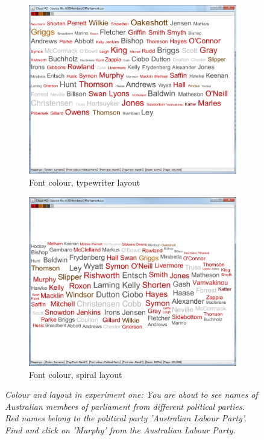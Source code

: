 \begin{figure}
\begin{subfigure}{.5\textwidth}
  \centering
  \includegraphics[scale=0.25]{C2S2L2.png}
  \caption{Font colour, typewriter layout}
\end{subfigure}%
\begin{subfigure}{.5\textwidth}
  \centering
  \includegraphics[scale=0.25]{C2S2L1.png}
  \caption{Font colour, spiral layout}
\end{subfigure}
\caption{\textit{Colour and layout in experiment one: You are about to see names of Australian members of parliament from different political parties. Red names belong to the political party 'Australian Labour Party'. Find and click on 'Murphy' from the Australian Labour Party.}}
\label{fig:exp1}
\end{figure}


